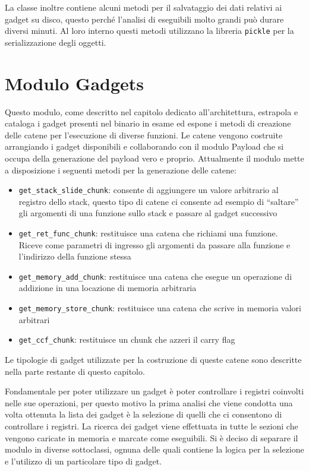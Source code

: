 La classe inoltre contiene alcuni metodi per il salvataggio dei dati
relativi ai gadget su disco, questo perché l'analisi di eseguibili
molto grandi può durare diversi minuti. Al loro interno questi metodi
utilizzano la libreria \lstinline{pickle} per la serializzazione degli
oggetti. 

\section{Modulo Gadgets}

Questo modulo, come descritto nel capitolo dedicato all'architettura,
estrapola e cataloga i gadget presenti nel binario in esame ed espone
i metodi di creazione delle catene per l'esecuzione di diverse
funzioni. Le catene vengono costruite arrangiando i gadget disponibili
e collaborando con il modulo Payload che si occupa della generazione
del payload vero e proprio. Attualmente il modulo mette a disposizione
i seguenti metodi per la generazione delle catene:
\begin{itemize}
  \item \lstinline{get_stack_slide_chunk}: consente di aggiungere un
    valore arbitrario al registro dello stack, questo tipo di catene
    ci consente ad esempio di ``saltare'' gli argomenti di una
    funzione sullo stack e passare al gadget successivo
  \item \lstinline{get_ret_func_chunk}: restituisce una catena che
    richiami una funzione. Riceve come parametri di ingresso gli
    argomenti da passare alla funzione e l'indirizzo della funzione
    stessa 
  \item \lstinline{get_memory_add_chunk}: restituisce una catena che
    esegue un operazione di addizione in una locazione di memoria
    arbitraria
  \item \lstinline{get_memory_store_chunk}: restituisce una catena che
    scrive in memoria valori arbitrari
  \item \lstinline{get_ccf_chunk}: restituisce un chunk che azzeri il
    carry flag
\end{itemize}

Le tipologie di gadget utilizzate per la costruzione di queste catene
sono descritte nella parte restante di questo capitolo. 

Fondamentale per poter utilizzare un gadget è poter controllare i
registri coinvolti nelle sue operazioni, per questo motivo la prima
analisi che viene condotta una volta ottenuta la lista dei gadget è la
selezione di quelli che ci consentono di controllare i registri. La
ricerca dei gadget viene effettuata in tutte le sezioni che vengono
caricate in memoria e marcate come eseguibili. Si è deciso di separare
il modulo in diverse sottoclassi, ognuna delle quali contiene la
logica per la selezione e l'utilizzo di un particolare tipo di gadget.


